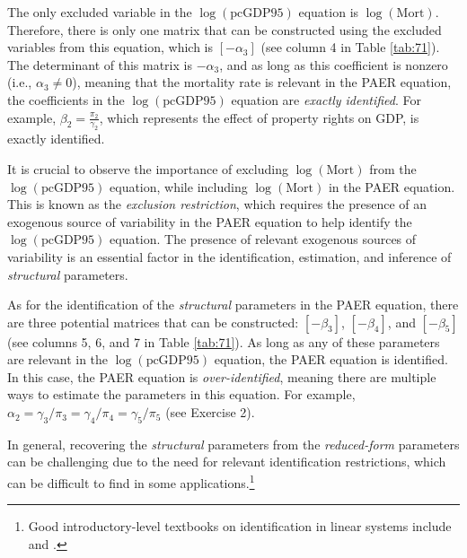 The only excluded variable in the $\log(\text{pcGDP95})$ equation is $\log(\text{Mort})$. Therefore, there is only one matrix that can be constructed using the excluded variables from this equation, which is $[-\alpha_3]$ (see column 4 in Table \ref{tab:71}). The determinant of this matrix is $-\alpha_3$, and as long as this coefficient is nonzero (i.e., $\alpha_3 \neq 0$), meaning that the mortality rate is relevant in the PAER equation, the coefficients in the $\log(\text{pcGDP95})$ equation are \textit{exactly identified}. For example, $\beta_2 = \frac{\pi_2}{\gamma_2}$, which represents the effect of property rights on GDP, is exactly identified.

It is crucial to observe the importance of excluding $\log(\text{Mort})$ from the $\log(\text{pcGDP95})$ equation, while including $\log(\text{Mort})$ in the PAER equation. This is known as the \textit{exclusion restriction}, which requires the presence of an exogenous source of variability in the PAER equation to help identify the $\log(\text{pcGDP95})$ equation. The presence of relevant exogenous sources of variability is an essential factor in the identification, estimation, and inference of \textit{structural} parameters.

As for the identification of the \textit{structural} parameters in the PAER equation, there are three potential matrices that can be constructed: $[-\beta_3]$, $[-\beta_4]$, and $[-\beta_5]$ (see columns 5, 6, and 7 in Table \ref{tab:71}). As long as any of these parameters are relevant in the $\log(\text{pcGDP95})$ equation, the PAER equation is identified. In this case, the PAER equation is \textit{over-identified}, meaning there are multiple ways to estimate the parameters in this equation. For example, $\alpha_2 = \gamma_3/\pi_3 = \gamma_4/\pi_4 = \gamma_5/\pi_5$ (see Exercise 2).

In general, recovering the \textit{structural} parameters from the \textit{reduced-form} parameters can be challenging due to the need for relevant identification restrictions, which can be difficult to find in some applications.\footnote{Good introductory-level textbooks on identification in linear systems include \cite[Chap. ~19]{gujarati2009basic} and \cite[Chap. ~16]{wooldridge2016introductory}.}

